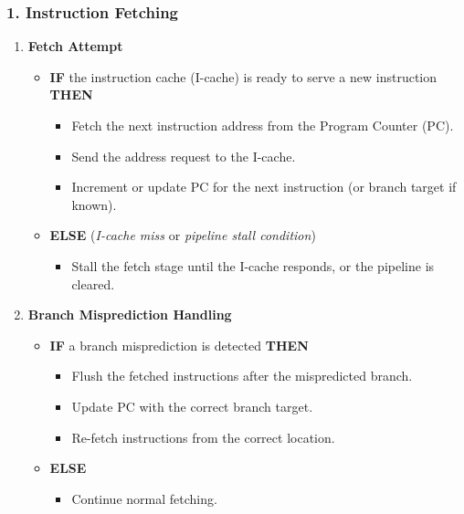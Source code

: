 {
  \small
  \subsubsection*{1. Instruction Fetching}
  \vspace{-5px}
  \begin{enumerate}
      \item \textbf{Fetch Attempt}
      \begin{itemize}
          \item \textbf{IF} the instruction cache (I-cache) is ready to serve a new instruction \textbf{THEN}
          \begin{itemize}
              \item Fetch the next instruction address from the Program Counter (PC).
              \item Send the address request to the I-cache.
              \item Increment or update PC for the next instruction (or branch target if known).
          \end{itemize}
          \item \textbf{ELSE} (\emph{I-cache miss} or \emph{pipeline stall condition})
          \begin{itemize}
              \item Stall the fetch stage until the I-cache responds, or the pipeline is cleared.
          \end{itemize}
      \end{itemize}
      \item \textbf{Branch Misprediction Handling}
      \begin{itemize}
          \item \textbf{IF} a branch misprediction is detected \textbf{THEN}
          \begin{itemize}
              \item Flush the fetched instructions after the mispredicted branch.
              \item Update PC with the correct branch target.
              \item Re-fetch instructions from the correct location.
          \end{itemize}
          \item \textbf{ELSE}
          \begin{itemize}
              \item Continue normal fetching.
          \end{itemize}
      \end{itemize}
  \end{enumerate}
  \vspace{-15px}
}
